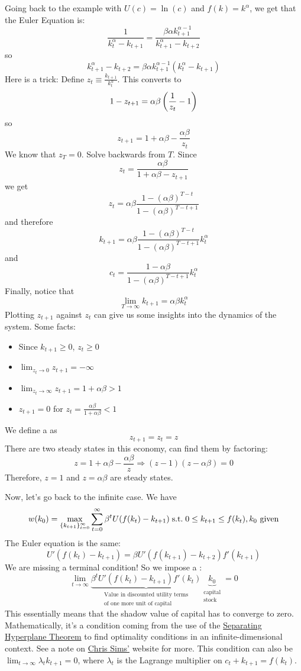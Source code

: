 \documentclass[10pt]{article}
\begin{document}
\begin{example}
\begin{enumerate}
		Going back to the example with $U(c) = \ln(c)$ and $f(k) = k^\alpha$, we get that the Euler Equation is:
		\[
		\frac{1}{k_t^\alpha - k_{t+1}} = \frac{\beta \alpha k_{t+1}^{\alpha - 1}}{k_{t+1}^\alpha - k_{t+2}}
		\]
		so
		\[
		k_{t+1}^\alpha - k_{t+2} = \beta \alpha k_{t+1}^{\alpha - 1}(k_t^\alpha - k_{t+1})
		\]
		Here is a trick: Define $z_t \equiv \frac{k_{t+1}}{k_t^\alpha}$. This converts to
		\[
		1 - z_{t+1} = \alpha \beta \left( \frac{1}{z_t} - 1 \right)
		\]
		so
		\[
		z_{t+1} = 1 + \alpha \beta - \frac{\alpha \beta}{z_t}
		\]
		We know that $z_T = 0$. Solve backwards from $T$. Since
		\[
		z_t = \frac{\alpha \beta}{1 + \alpha \beta - z_{t+1}}
		\]
		we get
		\[
		z_t = \alpha \beta \frac{1 - (\alpha \beta)^{T-t}}{1 - (\alpha \beta)^{T-t+1}}
		\]
		and therefore
		\[
		k_{t+1} = \alpha \beta \frac{1 - (\alpha \beta)^{T-t}}{1 - (\alpha \beta)^{T-t+1}}k_t^\alpha
		\]
		and
		\[
		c_t = \frac{1 - \alpha \beta}{1 - (\alpha \beta)^{T-t+1}}k_t^\alpha
		\]
		Finally, notice that
		\[
		\lim_{T \to \infty} k_{t+1} = \alpha \beta k_t^\alpha
		\]
		Plotting $z_{t+1}$ against $z_t$ can give us some insights into the dynamics of the system. Some facts:
		\begin{itemize}
			\item Since $k_{t+1} \ge 0$, $z_t \ge 0$
			\item $\lim_{z_t \to 0} z_{t+1} = -\infty$
			\item $\lim_{z_t \to \infty} z_{t+1} = 1 + \alpha \beta > 1$
			\item $z_{t+1} = 0$ for $z_t = \frac{\alpha \beta}{1 + \alpha \beta} < 1$
		\end{itemize}
		We define a  as
		\[
		z_{t+1} = z_t = z
		\]
		There are two steady states in this economy, can find them by factoring:
		\[
		z = 1 + \alpha \beta - \frac{\alpha \beta}{z} \Longrightarrow (z - 1)(z - \alpha \beta) = 0
		\]
		Therefore, $z = 1$ and $z = \alpha \beta$ are steady states.
		
		Now, let's go back to the infinite case. We have 
		\[
		w(k_0) = \max_{\{k_{t+1}\}_{t=0}^\infty} \sum_{t=0}^\infty \beta^t U(f(k_t) - k_{t+1}) \;\text{s.t.}\; 0 \le k_{t+1} \le f(k_t), k_0 \text{ given}
		\]
		The Euler equation is the same:
		\[
		U'(f(k_t) - k_{t+1}) = \beta U'(f(k_{t+1}) - k_{t+2})f'(k_{t+1})
		\]
		We are missing a terminal condition! So we impose a :
		\[
		\lim_{t\to\infty} \underbrace{\beta^t U'(f(k_t) - k_{t+1}) f'(k_t)}_{\substack{\text{Value in discounted utility terms} \\ \text{of one more unit of capital}}} \underbrace{k_0}_{\substack{\text{capital} \\\text{stock}}} = 0
		\]
		This essentially means that the shadow value of capital has to converge to zero. Mathematically, it's a condition coming from the use of the \href{https://en.wikipedia.org/wiki/Hyperplane_separation_theorem}{Separating Hyperplane Theorem} to find optimality conditions in an infinite-dimensional context. See a note on \href{https://www.princeton.edu/~sims/#Courses}{Chris Sims'} website for more. This condition can also be $\lim_{t\to\infty} \lambda_t k_{t+1} = 0$, where $\lambda_t$ is the Lagrange multiplier on $c_t + k_{t+1} = f(k_t)$.
		

\end{enumerate}
\end{example}
\end{document}

